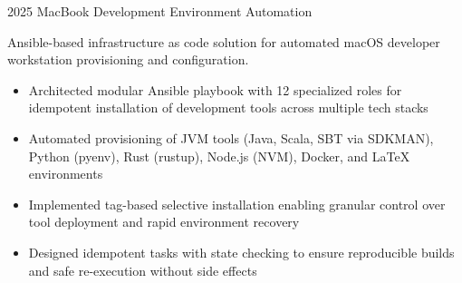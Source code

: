 \documentclass[9pt]{developercv} %
\begin{document}
\begin{entrylist}
{    }
    \entry
    {2025}
    {MacBook Development Environment Automation}
    {}
    {\vspace{-10pt}
    \begin{flushleft}
        Ansible-based infrastructure as code solution for automated macOS developer workstation provisioning and configuration.
    \end{flushleft}
    \begin{itemize}[noitemsep,topsep=0pt,parsep=0pt,partopsep=0pt, leftmargin=15pt]
                \item Architected modular Ansible playbook with 12 specialized roles for idempotent installation of development tools across multiple tech stacks
                \item Automated provisioning of JVM tools (Java, Scala, SBT via SDKMAN), Python (pyenv), Rust (rustup), Node.js (NVM), Docker, and LaTeX environments
                \item Implemented tag-based selective installation enabling granular control over tool deployment and rapid environment recovery
                \item Designed idempotent tasks with state checking to ensure reproducible builds and safe re-execution without side effects
            \end{itemize}


    }
\end{entrylist}

\vspace{-10 pt}


\vspace{-10 pt}

\end{document}
